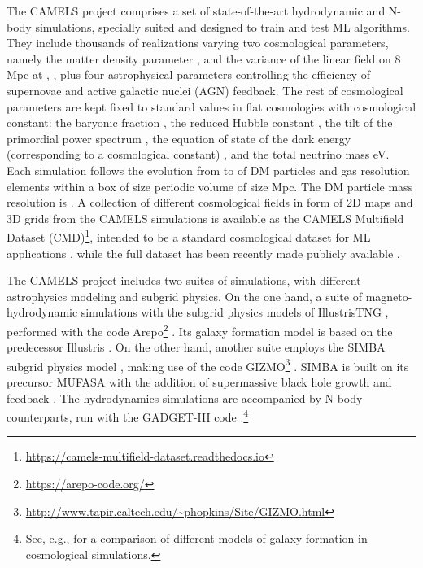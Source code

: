 \documentclass[twocolumn]{aastex631}
\begin{document}
The CAMELS project \citep{villaescusanavarro2020camels, 2022arXiv220101300V} comprises a set of state-of-the-art hydrodynamic and N-body simulations, specially suited and designed to train and test ML algorithms. They include thousands of realizations varying two cosmological parameters, namely the matter density parameter , and the variance of the linear field on 8 Mpc at , , plus four astrophysical parameters controlling the efficiency of supernovae and active galactic nuclei (AGN) feedback. The rest of cosmological parameters are kept fixed to standard values in flat cosmologies with cosmological constant: the baryonic fraction , the reduced Hubble constant , the tilt of the primordial power spectrum , the equation of state of the dark energy (corresponding to a cosmological constant) , and the total neutrino mass  eV. Each simulation follows the evolution from  to  of  DM particles and  gas resolution elements within a box of size periodic volume of size  Mpc. The DM particle mass resolution is . A collection of different cosmological fields in form of 2D maps and 3D grids from the CAMELS simulations is available as the CAMELS Multifield Dataset (CMD)\footnote{\url{https://camels-multifield-dataset.readthedocs.io}}, intended to be a standard cosmological dataset for ML applications \citep{2021arXiv210910915V}, while the full dataset has been recently made publicly available \citep{2022arXiv220101300V}.

The CAMELS project includes two suites of simulations, with different astrophysics modeling and subgrid physics. On the one hand, a suite of magneto-hydrodynamic simulations with the subgrid physics models of IllustrisTNG \citep{2017MNRAS.465.3291W, 2018MNRAS.473.4077P, 2019ComAC...6....2N}, performed with the code Arepo\footnote{\url{https://arepo-code.org/}} \citep[][see also \citealt{2018MNRAS.475..676S,2018MNRAS.480.5113M,2018MNRAS.477.1206N} for more details]{Weinberger:2019tbd}. Its galaxy formation model is based on the predecessor Illustris \citep{2013MNRAS.436.3031V, 2014Natur.509..177V}. On the other hand, another suite employs the SIMBA subgrid physics model \citep{Dave:2019yyq}, making use of the code
GIZMO\footnote{\url{http://www.tapir.caltech.edu/~phopkins/Site/GIZMO.html}} \citep{Hopkins:2014qka}. SIMBA is built on its precursor MUFASA \citep{2016MNRAS.462.3265D} with the addition of supermassive black hole growth and feedback \citep{2017MNRAS.464.2840A}. The hydrodynamics simulations are accompanied by N-body counterparts, run with the GADGET-III code \citep{Springel:2005mi}.\footnote{See, e.g., \cite{2020NatRP...2...42V} for a comparison of different models of galaxy formation in cosmological simulations.}
\end{document}
